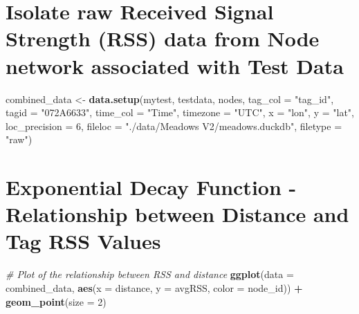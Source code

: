\documentclass[
]{book}
\newenvironment{Shaded}{\begin{snugshade}}{\end{snugshade}}
\newcommand{\AttributeTok}[1]{\textcolor[rgb]{0.13,0.29,0.53}{#1}}
\newcommand{\CommentTok}[1]{\textcolor[rgb]{0.56,0.35,0.01}{\textit{#1}}}
\newcommand{\DecValTok}[1]{\textcolor[rgb]{0.00,0.00,0.81}{#1}}
\newcommand{\FunctionTok}[1]{\textcolor[rgb]{0.13,0.29,0.53}{\textbf{#1}}}
\newcommand{\NormalTok}[1]{#1}
\newcommand{\OtherTok}[1]{\textcolor[rgb]{0.56,0.35,0.01}{#1}}
\newcommand{\SpecialCharTok}[1]{\textcolor[rgb]{0.81,0.36,0.00}{\textbf{#1}}}
\newcommand{\StringTok}[1]{\textcolor[rgb]{0.31,0.60,0.02}{#1}}
\begin{document}
\section{Isolate raw Received Signal Strength (RSS) data from Node network associated with Test Data}\label{isolate-raw-received-signal-strength-rss-data-from-node-network-associated-with-test-data}

\begin{Shaded}
\begin{Highlighting}[]
\NormalTok{combined\_data }\OtherTok{\textless{}{-}} \FunctionTok{data.setup}\NormalTok{(mytest, }
\NormalTok{                            testdata, }
\NormalTok{                            nodes, }
                            \AttributeTok{tag\_col =} \StringTok{"tag\_id"}\NormalTok{, }
                            \AttributeTok{tagid =} \StringTok{"072A6633"}\NormalTok{, }
                            \AttributeTok{time\_col =} \StringTok{"Time"}\NormalTok{,}
                            \AttributeTok{timezone =} \StringTok{"UTC"}\NormalTok{,}
                            \AttributeTok{x =} \StringTok{"lon"}\NormalTok{,}
                            \AttributeTok{y =} \StringTok{"lat"}\NormalTok{, }
                            \AttributeTok{loc\_precision =} \DecValTok{6}\NormalTok{, }
                            \AttributeTok{fileloc =} \StringTok{"./data/Meadows V2/meadows.duckdb"}\NormalTok{, }
                            \AttributeTok{filetype =} \StringTok{"raw"}\NormalTok{)}
\end{Highlighting}
\end{Shaded}

\section{Exponential Decay Function - Relationship between Distance and Tag RSS Values}\label{exponential-decay-function---relationship-between-distance-and-tag-rss-values}

\begin{Shaded}
\begin{Highlighting}[]
\CommentTok{\# Plot of the relationship between RSS and distance}
\FunctionTok{ggplot}\NormalTok{(}\AttributeTok{data =}\NormalTok{ combined\_data, }
       \FunctionTok{aes}\NormalTok{(}\AttributeTok{x =}\NormalTok{ distance, }
           \AttributeTok{y =}\NormalTok{ avgRSS, }
           \AttributeTok{color =}\NormalTok{ node\_id)) }\SpecialCharTok{+} 
  \FunctionTok{geom\_point}\NormalTok{(}\AttributeTok{size =} \DecValTok{2}\NormalTok{)}
\end{Highlighting}
\end{Shaded}
\end{document}

